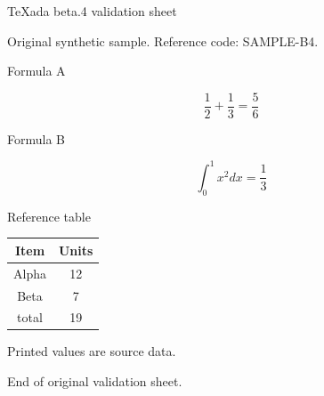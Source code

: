\documentclass[UTF8,fontset=fandol]{ctexart}
\begin{document}
TeXada beta.4 validation sheet

Original synthetic sample. Reference code: SAMPLE-B4.

Formula A

$$\frac{1}{2} + \frac{1}{3} = \frac{5}{6}$$

Formula B

$$\int_{0}^{1} x^2 dx = \frac{1}{3}$$

Reference table

   \begin{tabular}{|c|c|}
      \hline
      Item & Units \\
      \hline
      Alpha & 12 \\
      Beta & 7 \\
      total & 19 \\
      \hline
     \end{tabular}

Printed values are source data.

End of original validation sheet.
\end{document}
